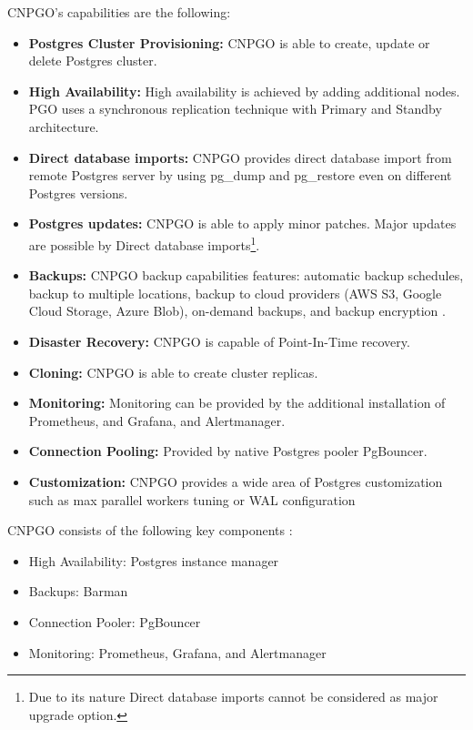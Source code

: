 CNPGO’s capabilities are the following:
\begin{itemize}
    \item \textbf{Postgres Cluster Provisioning:} CNPGO is able to create, update or delete Postgres cluster. \cite{CNPGdocuCapabilityLevels}
    \item \textbf{High Availability:} High availability is achieved by adding additional nodes. PGO uses a synchronous replication technique with Primary and Standby architecture. \cite{CNPGdocuReplication}
    \item \textbf{Direct database imports:} CNPGO provides direct database import from remote Postgres server by using pg\_dump and pg\_restore even on different Postgres versions. \cite{CNPGdocuDatabaseImports}
    \item \textbf{Postgres updates:} CNPGO is able to apply minor patches. \cite{CNPGdocuUpdates} Major updates are possible by Direct database imports\footnote[2]{Due to its nature Direct database imports cannot be considered as major upgrade option.}.
    \item \textbf{Backups:} CNPGO backup capabilities features: automatic backup schedules, backup to multiple locations, backup to cloud providers (AWS S3, Google Cloud Storage, Azure Blob), on-demand backups, and backup encryption \cite{CNPGdocuBackup}\cite{CNPGdocuTDE}.
    \item \textbf{Disaster Recovery:} CNPGO is capable of Point-In-Time recovery. \cite{CNPGdocuBackup}
    \item \textbf{Cloning:} CNPGO is able to create cluster replicas. \cite{CNPGdocuReplication}
    \item \textbf{Monitoring:} Monitoring can be provided by the additional installation of Prometheus, and Grafana, and Alertmanager. \cite{CNPGdocuQuickstart}
    \item \textbf{Connection Pooling:} Provided by native Postgres pooler PgBouncer. \cite{CNPGdocuConnectionPooling}
    \item \textbf{Customization:} CNPGO provides a wide area of Postgres customization such as max parallel workers tuning or WAL configuration \cite{CNPGdocuConfiguration}
\end{itemize}

CNPGO consists of the following key components \cite{PostgresOnKubernetes} \cite{CNPGdocuQuickstart}:
\begin{itemize}
    \item High Availability: Postgres instance manager
    \item Backups: Barman
    \item Connection Pooler: PgBouncer
    \item Monitoring: Prometheus, Grafana, and Alertmanager
\end{itemize}

